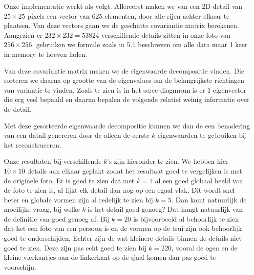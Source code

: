 \documentclass{article}
\begin{document}
Onze implementatie werkt als volgt. Allereerst maken we van een 2D detail van
$25\times25$ pixels een vector van 625 elementen, door alle rijen achter elkaar te
plaatsen. Van deze vectors gaan we de geschatte covariantie matrix
berekenen. Aangezien er $232 \times 232 = 53824$ verschillende details zitten in
onze foto van $256\times 256$. gebruiken we formule zoals in 5.1 beschreven om
alle data maar 1 keer in memory te hoeven laden.

Van deze covariantie matrix maken we de eigenwaarde decompositie vinden.
Die sorteren we daarna op grootte van de eigenvalues om de belangrijkste
richtingen van variantie te vinden.
Zoals te zien is in het scree diagmram is er 1 eigenvector die erg veel bepaald
en daarna bepalen de volgende relatief weinig informatie over de detail.



Met deze gesorteerde eigenwaarde decompositie kunnen we dan de een benadering
van een datail genereren door de alleen de eerste $k$ eigenwaarden te gebruiken
bij het reconstrueeren.

Onze resultaten bij verschillende $k$'s zijn hieronder te zien. We hebben
hier $10 \times 10$ details aan elkaar geplakt zodat het resultaat goed te
vergelijken is met de originele foto. Er is goed te zien dat met $k = 1$ al een
goed globaal beeld van de foto te zien is, al lijkt elk detail dan nog op een
egaal vlak. Dit wordt snel beter en globale vormen zijn al redelijk te zien bij
$k = 5$. Dan komt natuurlijk de moeilijke vraag, bij welke $k$ is het detail
goed genoeg? Dat hangt natuurlijk van de definitie van goed genoeg af. Bij $k =
20$ is bijvoorbeeld al behoorlijk te zien dat het een foto van een persoon is en
de vormen op de trui zijn ook behoorlijk goed te onderschijden. Echter zijn de
wat kleinere details binnen de details niet goed te zien. Deze zijn pas echt
goed te zien bij $k = 220$, vooral de ogen en de kleine vierkantjes aan de
linkerkant op de sjaal komen dan pas goed te voorschijn.



\end{document}
